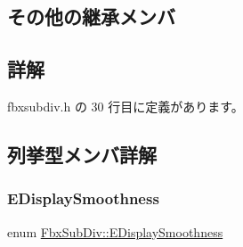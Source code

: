 \subsection*{その他の継承メンバ}


\subsection{詳解}


 fbxsubdiv.\+h の 30 行目に定義があります。



\subsection{列挙型メンバ詳解}
\mbox{\label{class_fbx_sub_div_a7583b5d09f0eef70bad4563dffbb7e4d}} 
\subsubsection{\texorpdfstring{E\+Display\+Smoothness}{EDisplaySmoothness}}
{\footnotesize\ttfamily enum \hyperlink{class_fbx_sub_div_a7583b5d09f0eef70bad4563dffbb7e4d}{Fbx\+Sub\+Div\+::\+E\+Display\+Smoothness}}

